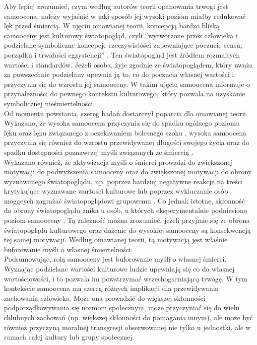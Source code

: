 \documentclass[man]{apa6}
\begin{document}
Aby lepiej zrozumieć, czym według autorów teorii opanowania trwogi jest samoocena, należy wyjaśnić w jaki sposób jej wysoki poziom miałby redukować lęk przed śmiercią. W ujęciu omawianej teorii, koncepcją bardzo bliską samooceny jest kulturowy światopogląd, czyli ``wytworzone przez człowieka i podzielane symboliczne koncepcje rzeczywistości zapewniające poczucie sensu, porządku i trwałości egzystencji'' \parencite[][, s. 436]{pyszczynski2004people}. Ten światopogląd jest źródłem rozmaitych wartości i standardów. Jeżeli osoba, żyje zgodnie ze światopoglądem, który uważa za powszechnie podzielany upewnia ją to, co do poczucia własnej wartości i przyczynia się do wzrostu jej samooceny. W takim ujęciu samoocena informuje o przynależności do pewnego kontekstu kulturowego, który pozwala na uzyskanie symbolicznej nieśmiertelności.\\

Od momentu powstania, szereg badań dostarczył poparcia dla omawianej teorii. Wykazano, że wysoka samoocena przyczynia się do spadku ogólnego poziomu lęku oraz lęku związanego z oczekiwaniem bolesnego szoku \parencite{greenberg1992people}, wysoka samoocena przyczynia się również do wzrostu przewidywanej długości swojego życia \parencite{greenberg1993effects} oraz do spadku dostępności poznawczej myśli związanych ze śmiercią \parencite{harmon1997terror}.\\

Wykazano również, że aktywizacja myśli o śmierci prowadzi do zwiększonej motywacji do podwyższenia samooceny \parencite{greenberg1992people} oraz do zwiększonej motywacji do obrony wyznawanego światopoglądu, np. poprzez bardziej negatywne reakcje na treści krytykujące wyznawane wartości kulturowe \parencite{harmon1997terror} lub poprzez wykluczanie osób mogących zagrażać światopoglądowi grupowemu \parencite{castano2004case}. Co jednak istotne, skłonność do obrony światopoglądu znika u osób, u których eksperymentalnie podniesiono poziom samooceny \parencite{harmon1997terror}. Tą zależność można zrozumieć, jeżeli przyjmie się że obrona światopoglądu kulturowego oraz dążenie do wysokiej samooceny są konsekwencją tej samej motywacji. Według omawianej teorii, tą motywacją jest właśnie buforowanie myśli o własnej śmiertelności.\\

Podsumowując, rolą samooceny jest buforowanie myśli o własnej śmierci. Wyznając podzielane wartości kulturowe ludzie upewniają się co do własnej wartościowości, i to pozwala im powstrzymać wszechogarniającą trwogę. W tym kontekście samoocena ma szereg różnych implikacji dla przewidywania zachowania człowieka. Może ona prowadzić do większej skłonności podporządkowywania się normom społecznym, może przyczyniać się do wielu chlubnych zachowań (np. większej skłonności do pomagania innym), ale może być również przyczyną moralnej transgresji obserwowanej nie tylko u jednostki, ale w ramach całej kultury lub grupy społecznej.
\end{document}
